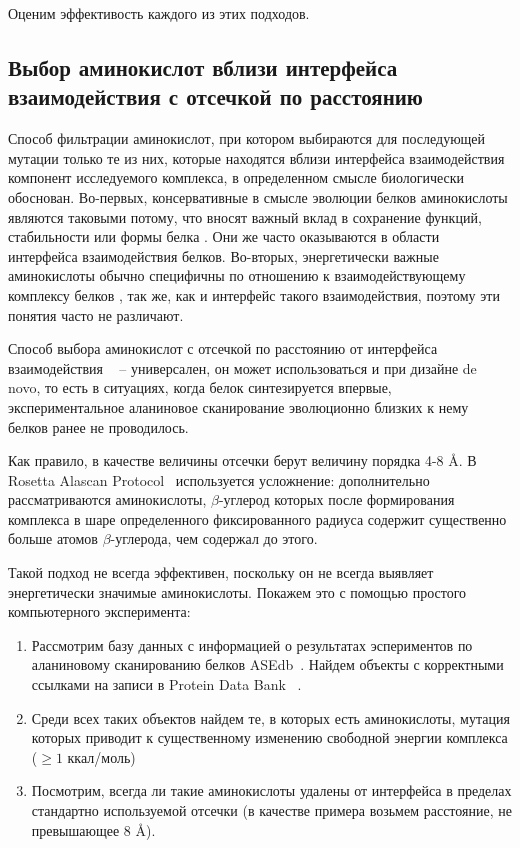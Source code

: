 Оценим эффективость каждого из этих подходов.

\subsection{Выбор аминокислот вблизи интерфейса взаимодействия с отсечкой по расстоянию}

Способ фильтрации аминокислот, при котором выбираются для последующей мутации только те из них, которые находятся вблизи интерфейса взаимодействия компонент исследуемого комплекса, в определенном смысле биологически обоснован. Во-первых,  консервативные в смысле эволюции белков аминокислоты являются таковыми потому, что вносят важный вклад в сохранение функций, стабильности или формы белка \cite{toadd}. Они же часто оказываются в области интерфейса взаимодействия белков. Во-вторых, энергетически важные аминокислоты обычно специфичны по отношению к взаимодействующему комплексу белков \cite{toadd1}, так же, как и интерфейс такого взаимодействия, поэтому эти понятия часто не различают.

Способ выбора аминокислот с  отсечкой по расстоянию от интерфейса взаимодействия ~\cite{kortemme2004} -- универсален, он может использоваться и при дизайне de novo, то есть в ситуациях, когда белок синтезируется впервые, экспериментальное аланиновое сканирование эволюционно близких к нему белков ранее не проводилось. 

Как правило, в качестве величины отсечки берут величину порядка  4-8 \AA{}. В  Rosetta Alascan Protocol~\cite{kortemme2004} используется усложнение: дополнительно рассматриваются аминокислоты, $\beta$-углерод которых после формирования комплекса в шаре определенного фиксированного радиуса содержит существенно больше атомов $\beta$-углерода, чем содержал до этого.

Такой подход не всегда эффективен, поскольку он не всегда выявляет энергетически значимые аминокислоты. Покажем это с помощью простого компьютерного эксперимента:
\begin{enumerate}
\item Рассмотрим базу данных с информацией о результатах эспериментов по аланиновому сканированию белков ASEdb~\cite{asedb2001}. Найдем объекты с корректными ссылками на записи в Protein Data Bank ~\cite{rcsb}.
\item Среди всех таких объектов найдем те, в которых есть аминокислоты, мутация которых приводит к существенному изменению свободной энергии комплекса ($\geq 1$ ккал/моль)
\item Посмотрим, всегда ли такие аминокислоты удалены от интерфейса в пределах стандартно используемой отсечки (в качестве примера возьмем расстояние, не превышающее 8 \AA{}).
\end{enumerate}

